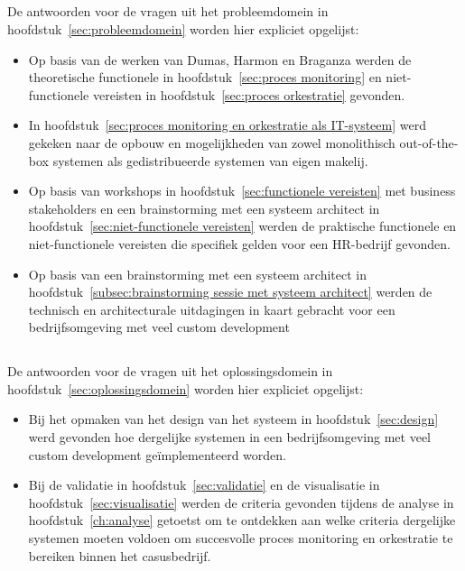 \subsection{}%
\label{subsec:probleemdomein conclusie}
De antwoorden voor de vragen uit het probleemdomein in hoofdstuk~\ref{sec:probleemdomein} worden hier expliciet opgelijst:
\begin{itemize}
  \item Op basis van de werken van Dumas, Harmon en Braganza werden de theoretische functionele in hoofdstuk~\ref{sec:proces monitoring} en niet-functionele vereisten in hoofdstuk~\ref{sec:proces orkestratie} gevonden.
  \item In hoofdstuk~\ref{sec:proces monitoring en orkestratie als IT-systeem} werd gekeken naar de opbouw en mogelijkheden van zowel monolithisch out-of-the-box systemen als gedistribueerde systemen van eigen makelij.
  \item Op basis van workshops in hoofdstuk~\ref{sec:functionele vereisten} met business stakeholders en een brainstorming met een systeem architect in hoofdstuk~\ref{sec:niet-functionele vereisten} werden de praktische functionele en niet-functionele vereisten die specifiek gelden voor een HR-bedrijf gevonden.
  \item Op basis van een brainstorming met een systeem architect in hoofdstuk~\ref{subsec:brainstorming sessie met systeem architect} werden de technisch en architecturale uitdagingen in kaart gebracht voor een bedrijfsomgeving met veel custom development
\end{itemize}

\subsection{}%
\label{subsec:oplossingsdomein conclusie}
De antwoorden voor de vragen uit het oplossingsdomein in hoofdstuk~\ref{sec:oplossingsdomein} worden hier expliciet opgelijst:
\begin{itemize}
  \item Bij het opmaken van het design van het systeem in hoofdstuk~\ref{sec:design} werd gevonden hoe dergelijke systemen in een bedrijfsomgeving met veel custom development geïmplementeerd worden. 
  \item Bij de validatie in hoofdstuk~\ref{sec:validatie} en de visualisatie in hoofdstuk~\ref{sec:visualisatie} werden de criteria gevonden tijdens de analyse in hoofdstuk~\ref{ch:analyse} getoetst om te ontdekken aan welke criteria dergelijke systemen moeten voldoen om succesvolle proces monitoring en orkestratie te bereiken binnen het casusbedrijf.
\end{itemize}

